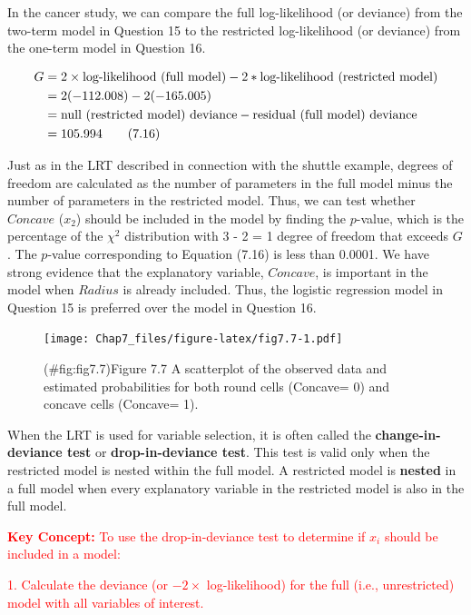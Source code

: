 \documentclass[
]{report}
\begin{document}
In the cancer study, we can compare the full log-likelihood (or deviance) from the two-term model in
Question 15 to the restricted log-likelihood (or deviance) from the one-term model in Question 16.

\begin{align}
G &= 2 \times \text{log-likelihood (full model)} - 2 * \text{log-likelihood (restricted model)} \notag \\
&= 2(-112.008) - 2(-165.005) \notag \\
&= \text{null (restricted model) deviance} - \text{residual (full model) deviance} \notag \\
&= 105.994 \tag{7.16}
\end{align}

Just as in the LRT described in connection with the shuttle example, degrees of freedom are calculated as the
number of parameters in the full model minus the number of parameters in the restricted model. Thus, we can
test whether \(Concave\) (\(x_2\)) should be included in the model by finding the \(p\)-value, which is the percentage of
the \(\chi^2\) distribution with 3 - 2 = 1 degree of freedom that exceeds \(G\). The \(p\)-value corresponding to Equation
(7.16) is less than 0.0001. We have strong evidence that the explanatory variable, \(Concave\), is important in
the model when \(Radius\) is already included. Thus, the logistic regression model in Question 15 is preferred
over the model in Question 16.

\begin{figure}
\centering
\texttt{[image: Chap7\_files/figure-latex/fig7.7-1.pdf]}
\caption{(\#fig:fig7.7)Figure 7.7 A scatterplot of the observed data and estimated probabilities for both round cells (Concave= 0) and concave cells (Concave= 1).}
\end{figure}

When the LRT is used for variable selection, it is often called the \textbf{change-in-deviance test} or \textbf{drop-in-deviance test}. This test is valid only when the restricted model is nested within the full model. A
restricted model is \textbf{nested} in a full model when every explanatory variable in the restricted model is also
in the full model.

\Large

\textbf{\textcolor{red}{Key Concept:}}
\textcolor{red}{To use the drop-in-deviance test to determine if $x_i$ should be included in a model:}

\textcolor{red}{1. Calculate the deviance (or $-2 \times$ log-likelihood) for the full (i.e., unrestricted) model with all variables of interest.}
\end{document}
